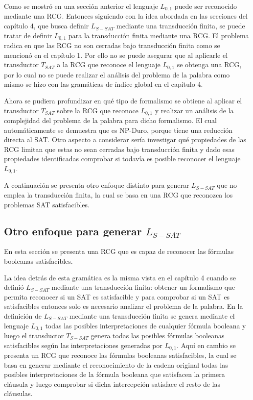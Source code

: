 Como se mostró en una sección anterior el lenguaje $L_{0,1}$ puede ser reconocido mediante una RCG.
Entonces siguiendo con la idea abordada en las secciones del capítulo 4, que busca definir $L_{S-SAT}$
mediante una transducción finita, se puede tratar de definir $L_{0,1}$ para la transducción finita mediante una RCG.
El problema radica en que las RCG no son cerradas bajo transducción finita como se mencionó en el capítulo 1.
Por ello no se puede asegurar que al aplicarle el transductor $T_{SAT}$ a la RCG que reconoce el lenguaje
$L_{0,1}$ se obtenga una RCG, por lo cual no se puede realizar el análisis del problema de la palabra como
mismo se hizo con las gramáticas de índice global en el capítulo 4.

Ahora se pudiera profundizar en qué tipo de formalismo se obtiene al aplicar el transductor $T_{SAT}$
sobre la RCG que reconoce $L_{0,1}$ y realizar un análisis de la complejidad del problema de la palabra
para dicho formalismo. El cual automáticamente se demuestra que es NP-Duro, porque tiene una reducción
directa al SAT. Otro aspecto a considerar sería investigar qué propiedades de las RCG limitan que estas no sean cerradas bajo transducción finita y dado esas propiedades identificadas comprobar si todavía es posible reconocer el lenguaje $L_{0,1}$.

A continuación se presenta otro enfoque distinto para generar $L_{S-SAT}$ que no emplea la transducción finita,
la cual se basa en una RCG que reconozca los problemas SAT satisfacibles.

\subsection{Otro enfoque para generar $L_{S-SAT}$}

En esta sección se presenta una RCG que es capaz de reconocer las fórmulas booleanas satisfacibles.

La idea detrás de esta gramática es la misma vista en el capítulo 4 cuando se definió $L_{S-SAT}$ mediante
una transducción finita: obtener un formalismo que permita reconocer si un SAT es satisfacible y para comprobar
si un SAT es satisfacibles entonces solo es necesario analizar el problema de la palabra. En la definición
de $L_{S-SAT}$ mediante una transducción finita se genera mediante el lenguaje $L_{0,1}$ todas las posibles interpretaciones
de cualquier fórmula booleana y luego el transductor $T_{S-SAT}$ genera todas las posibles fórmulas booleanas satisfacibles
según las interpretaciones generadas por $L_{0,1}$. Aquí en cambio se presenta un RCG que reconoce las fórmulas booleanas
satisfacibles, la cual se basa en generar mediante el reconocimiento de la cadena original todas las posibles interpretaciones
de la fórmula booleana que satisfacen la primera cláusula y luego comprobar si dicha intercepción satisface el resto
de las cláusulas.


